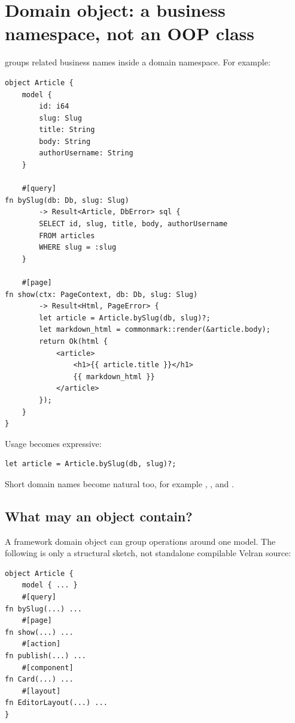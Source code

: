 \section{Domain object: a business namespace, not an OOP class}

 groups related business names inside a domain namespace. For example:

\begin{lstlisting}[language=Velran]
object Article {
    model {
        id: i64
        slug: Slug
        title: String
        body: String
        authorUsername: String
    }

    #[query]
fn bySlug(db: Db, slug: Slug)
        -> Result<Article, DbError> sql {
        SELECT id, slug, title, body, authorUsername
        FROM articles
        WHERE slug = :slug
    }

    #[page]
fn show(ctx: PageContext, db: Db, slug: Slug)
        -> Result<Html, PageError> {
        let article = Article.bySlug(db, slug)?;
        let markdown_html = commonmark::render(&article.body);
        return Ok(html {
            <article>
                <h1>{{ article.title }}</h1>
                {{ markdown_html }}
            </article>
        });
    }
}
\end{lstlisting}

Usage becomes expressive:

\begin{lstlisting}[language=Velran]
let article = Article.bySlug(db, slug)?;
\end{lstlisting}

Short domain names become natural too, for example , , and .

\subsection*{What may an object contain?}

A framework domain object can group operations around one model. The following is only a structural sketch, not standalone compilable Velran source:

\begin{lstlisting}
object Article {
    model { ... }
    #[query]
fn bySlug(...) ...
    #[page]
fn show(...) ...
    #[action]
fn publish(...) ...
    #[component]
fn Card(...) ...
    #[layout]
fn EditorLayout(...) ...
}
\end{lstlisting}

